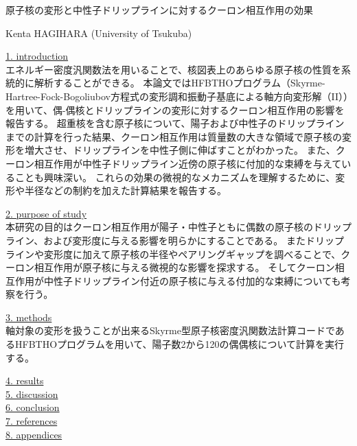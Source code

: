 \topmargin=-14mm
\oddsidemargin=-5mm   %
\evensidemargin=-5mm  %
\textheight=247mm %
\textwidth=170mm  %
\newcommand{\mysection}[1]{\vspace{\baselineskip} \noindent \underline{#1} \\}
\newcommand{\vecrp}[0]{{\vec{r}\,}'}

\baselineskip=0.6cm

\begin{center}
{\Large
原子核の変形と中性子ドリップラインに対するクーロン相互作用の効果
}
\end{center}


\begin{flushright}
Kenta HAGIHARA (University of Tsukuba)
\end{flushright}


\mysection{1. introduction}
エネルギー密度汎関数法を用いることで、核図表上のあらゆる原子核の性質を系統的に解析することができる。
本論文ではHFBTHOプログラム（Skyrme-Hartree-Fock-Bogoliubov方程式の変形調和振動子基底による軸方向変形解（II））を用いて、偶-偶核とドリップラインの変形に対するクーロン相互作用の影響を報告する。
超重核を含む原子核について、陽子および中性子のドリップラインまでの計算を行った結果、クーロン相互作用は質量数の大きな領域で原子核の変形を増大させ、ドリップラインを中性子側に伸ばすことがわかった。
また、クーロン相互作用が中性子ドリップライン近傍の原子核に付加的な束縛を与えていることも興味深い。
これらの効果の微視的なメカニズムを理解するために、変形や半径などの制約を加えた計算結果を報告する。

\mysection{2. purpose of study}
本研究の目的はクーロン相互作用が陽子・中性子ともに偶数の原子核のドリップライン、および変形度に与える影響を明らかにすることである。
またドリップラインや変形度に加えて原子核の半径やペアリングギャップを調べることで、クーロン相互作用が原子核に与える微視的な影響を探求する。
そしてクーロン相互作用が中性子ドリップライン付近の原子核に与える付加的な束縛についても考察を行う。

\mysection{3. methods}
軸対象の変形を扱うことが出来るSkyrme型原子核密度汎関数法計算コードであるHFBTHOプログラムを用いて、陽子数2から120の偶偶核について計算を実行する。

\mysection{4. results}

\mysection{5. discussion}

\mysection{6. conclusion}

\mysection{7. references}

\mysection{8. appendices}


